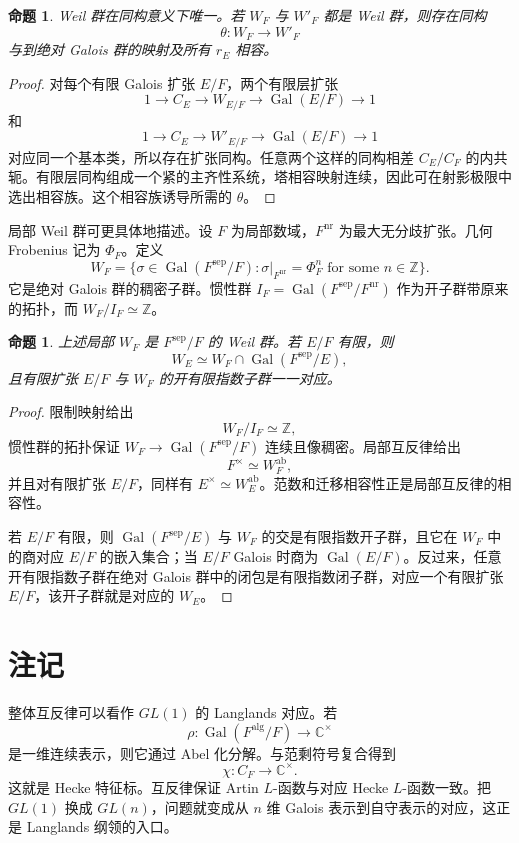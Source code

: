 \documentclass[11pt,a4paper,openany]{ctexbook}
\numberwithin{equation}{chapter}
\newcommand{\C}{\mathbb{C}}
\newcommand{\Z}{\mathbb{Z}}
\newcommand{\Gal}{\operatorname{Gal}}
\theoremstyle{plain}
\newtheorem{proposition}[theorem]{命题}
\theoremstyle{definition}
\theoremstyle{remark}
\begin{document}
\begin{proposition}
Weil 群在同构意义下唯一。若 $W_F$ 与 $W'_F$ 都是 Weil 群，则存在同构
\[
\theta:W_F\to W'_F
\]
与到绝对 Galois 群的映射及所有 $r_E$ 相容。
\end{proposition}

\begin{proof}
对每个有限 Galois 扩张 $E/F$，两个有限层扩张
\[
1\to C_E\to W_{E/F}\to\Gal(E/F)\to1
\]
和
\[
1\to C_E\to W'_{E/F}\to\Gal(E/F)\to1
\]
对应同一个基本类，所以存在扩张同构。任意两个这样的同构相差 $C_E/C_F$ 的内共轭。有限层同构组成一个紧的主齐性系统，塔相容映射连续，因此可在射影极限中选出相容族。这个相容族诱导所需的 $\theta$。
\end{proof}

局部 Weil 群可更具体地描述。设 $F$ 为局部数域，$F^{\mathrm{nr}}$ 为最大无分歧扩张。几何 Frobenius 记为 $\Phi_F$。定义
\[
W_F=\{\sigma\in\Gal(F^{\mathrm{sep}}/F):\sigma|_{F^{\mathrm{nr}}}=\Phi_F^n\text{ for some }n\in\Z\}.
\]
它是绝对 Galois 群的稠密子群。惯性群 $I_F=\Gal(F^{\mathrm{sep}}/F^{\mathrm{nr}})$ 作为开子群带原来的拓扑，而 $W_F/I_F\simeq\Z$。

\begin{proposition}
上述局部 $W_F$ 是 $F^{\mathrm{sep}}/F$ 的 Weil 群。若 $E/F$ 有限，则
\[
W_E\simeq W_F\cap\Gal(F^{\mathrm{sep}}/E),
\]
且有限扩张 $E/F$ 与 $W_F$ 的开有限指数子群一一对应。
\end{proposition}

\begin{proof}
限制映射给出
\[
W_F/I_F\simeq\Z,
\]
惯性群的拓扑保证 $W_F\to\Gal(F^{\mathrm{sep}}/F)$ 连续且像稠密。局部互反律给出
\[
F^\times\simeq W_F^{\operatorname{ab}},
\]
并且对有限扩张 $E/F$，同样有 $E^\times\simeq W_E^{\operatorname{ab}}$。范数和迁移相容性正是局部互反律的相容性。

若 $E/F$ 有限，则 $\Gal(F^{\mathrm{sep}}/E)$ 与 $W_F$ 的交是有限指数开子群，且它在 $W_F$ 中的商对应 $E/F$ 的嵌入集合；当 $E/F$ Galois 时商为 $\Gal(E/F)$。反过来，任意开有限指数子群在绝对 Galois 群中的闭包是有限指数闭子群，对应一个有限扩张 $E/F$，该开子群就是对应的 $W_E$。
\end{proof}

\section{注记}

整体互反律可以看作 $GL(1)$ 的 Langlands 对应。若
\[
\rho:\Gal(F^{\mathrm{alg}}/F)\to\C^\times
\]
是一维连续表示，则它通过 Abel 化分解。与范剩符号复合得到
\[
\chi:C_F\to\C^\times.
\]
这就是 Hecke 特征标。互反律保证 Artin $L$-函数与对应 Hecke $L$-函数一致。把 $GL(1)$ 换成 $GL(n)$，问题就变成从 $n$ 维 Galois 表示到自守表示的对应，这正是 Langlands 纲领的入口。
\end{document}
